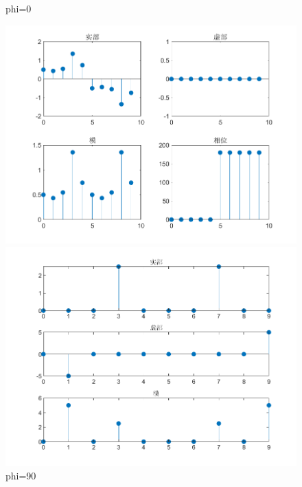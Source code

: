 \documentclass{../source/zjureport}
\begin{document}
\begin{figure}[H]
\begin{minipage}[t]{0.48\textwidth}
                    \end{minipage}
                    \caption{phi=0}
                \end{figure}

                 

                \begin{figure}[H]
                    \centering
                    \begin{minipage}[t]{0.48\textwidth}
                    \centering
                    \includegraphics[width=\textwidth]{figure/复合函数序列_phi=90.png}
                    \end{minipage}
                    \begin{minipage}[t]{0.48\textwidth}
                    \centering
                    \includegraphics[width=\textwidth]{figure/频谱_复合函数序列_phi=90.png}
                    \end{minipage}
                    \caption{phi=90}
                \end{figure}
\end{document}
